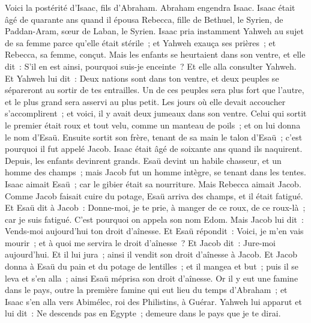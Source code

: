 \begin{multicols}{2}
Voici la postérité d'Isaac, fils d'Abraham.
Abraham engendra Isaac. Isaac était âgé de quarante ans quand il épousa Rebecca, fille de Bethuel, le Syrien, de Paddan-Aram, sœur de Laban, le Syrien.
Isaac pria instamment Yahweh au sujet de sa femme parce qu'elle était stérile~; et Yahweh exauça ses prières~; et Rebecca, sa femme, conçut.
Mais les enfants se heurtaient dans son ventre, et elle dit~: S'il en est ainsi, pourquoi suis-je enceinte~? Et elle alla consulter Yahweh.
Et Yahweh lui dit~: Deux nations sont dans ton ventre, et deux peuples se sépareront au sortir de tes entrailles. Un de ces peuples sera plus fort que l'autre, et le plus grand sera asservi au plus petit.
Les jours où elle devait accoucher s'accomplirent~; et voici, il y avait deux jumeaux dans son ventre.
Celui qui sortit le premier était roux et tout velu, comme un manteau de poils~; et on lui donna le nom d'Esaü.
Ensuite sortit son frère, tenant de sa main le talon d'Esaü~; c'est pourquoi il fut appelé Jacob. Isaac était âgé de soixante ans quand ils naquirent.
Depuis, les enfants devinrent grands. Esaü devint un habile chasseur, et un homme des champs~; mais Jacob fut un homme intègre, se tenant dans les tentes.
Isaac aimait Esaü~; car le gibier était sa nourriture. Mais Rebecca aimait Jacob.
Comme Jacob faisait cuire du potage, Esaü arriva des champs, et il était fatigué.
Et Esaü dit à Jacob~: Donne-moi, je te prie, à manger de ce roux, de ce roux-là~; car je suis fatigué. C'est pourquoi on appela son nom Edom.
Mais Jacob lui dit~: Vends-moi aujourd'hui ton droit d'aînesse.
Et Esaü répondit~: Voici, je m'en vais mourir~; et à quoi me servira le droit d'aînesse~?
Et Jacob dit~: Jure-moi aujourd'hui. Et il lui jura~; ainsi il vendit son droit d'aînesse à Jacob.
Et Jacob donna à Esaü du pain et du potage de lentilles~; et il mangea et but~; puis il se leva et s'en alla~; ainsi Esaü méprisa son droit d'aînesse.
\VerseOne{}Or il y eut une famine dans le pays, outre la première famine qui eut lieu du temps d'Abraham~; et Isaac s'en alla vers Abimélec, roi des Philistins, à Guérar.
Yahweh lui apparut et lui dit~: Ne descends pas en Egypte~; demeure dans le pays que je te dirai.

\end{multicols}
